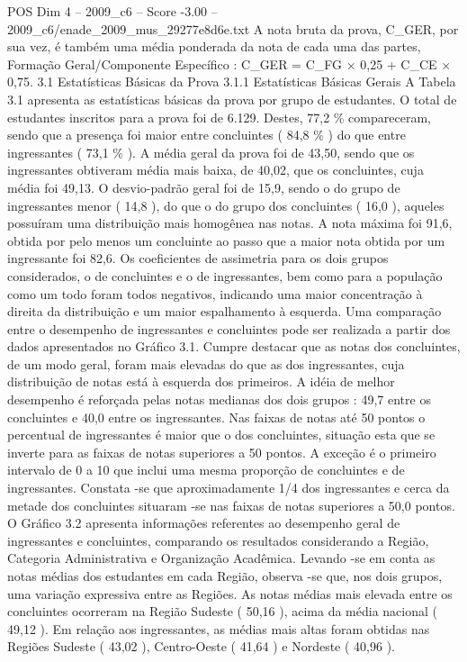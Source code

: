 \begin{textsample}{POS Dim 4 – 2009\_c6 – Score -3.00 – 2009\_c6/enade\_2009\_mus\_29277e8d6e.txt}
A nota bruta da prova, C\_GER, por sua vez, é também uma média ponderada da nota de cada uma das partes, Formação Geral/Componente Específico : C\_GER = C\_FG × 0,25 + C\_CE × 0,75. 3.1 Estatísticas Básicas da Prova 3.1.1 Estatísticas Básicas Gerais A Tabela 3.1 apresenta as estatísticas básicas da prova por grupo de estudantes.
O total de estudantes inscritos para a prova foi de 6.129.
Destes, 77,2 \% compareceram, sendo que a presença foi maior entre concluintes ( 84,8 \% ) do que entre ingressantes ( 73,1 \% ).
A média geral da prova foi de 43,50, sendo que os ingressantes obtiveram média mais baixa, de 40,02, que os concluintes, cuja média foi 49,13.
O desvio-padrão geral foi de 15,9, sendo o do grupo de ingressantes menor ( 14,8 ), do que o do grupo dos concluintes ( 16,0 ), aqueles possuíram uma distribuição mais homogênea nas notas.
A nota máxima foi 91,6, obtida por pelo menos um concluinte ao passo que a maior nota obtida por um ingressante foi 82,6.
Os coeficientes de assimetria para os dois grupos considerados, o de concluintes e o de ingressantes, bem como para a população como um todo foram todos negativos, indicando uma maior concentração à direita da distribuição e um maior espalhamento à esquerda.
Uma comparação entre o desempenho de ingressantes e concluintes pode ser realizada a partir dos dados apresentados no Gráfico 3.1.
Cumpre destacar que as notas dos concluintes, de um modo geral, foram mais elevadas do que as dos ingressantes, cuja distribuição de notas está à esquerda dos primeiros.
A idéia de melhor desempenho é reforçada pelas notas medianas dos dois grupos : 49,7 entre os concluintes e 40,0 entre os ingressantes.
Nas faixas de notas até 50 pontos o percentual de ingressantes é maior que o dos concluintes, situação esta que se inverte para as faixas de notas superiores a 50 pontos.
A exceção é o primeiro intervalo de 0 a 10 que inclui uma mesma proporção de concluintes e de ingressantes.
Constata -se que aproximadamente 1/4 dos ingressantes e cerca da metade dos concluintes situaram -se nas faixas de notas superiores a 50,0 pontos.
O Gráfico 3.2 apresenta informações referentes ao desempenho geral de ingressantes e concluintes, comparando os resultados considerando a Região, Categoria Administrativa e Organização Acadêmica.
Levando -se em conta as notas médias dos estudantes em cada Região, observa -se que, nos dois grupos, uma variação expressiva entre as Regiões.
As notas médias mais elevada entre os concluintes ocorreram na Região Sudeste ( 50,16 ), acima da média nacional ( 49,12 ).
Em relação aos ingressantes, as médias mais altas foram obtidas nas Regiões Sudeste ( 43,02 ), Centro-Oeste ( 41,64 ) e Nordeste ( 40,96 ).

\end{textsample}
